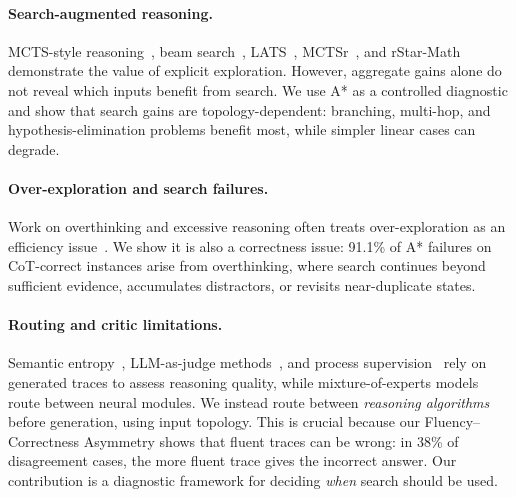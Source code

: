 \documentclass[11pt]{article}
\begin{document}
\paragraph{Search-augmented reasoning.}
MCTS-style reasoning~\cite{hao2023reasoning}, beam search~\cite{xie2024self}, LATS~\cite{zhou2024lats}, MCTSr~\cite{zhang2024mctsrmath}, and rStar-Math~\cite{guan2025rstar} demonstrate the value of explicit exploration. However, aggregate gains alone do not reveal which inputs benefit from search. We use A* as a controlled diagnostic and show that search gains are topology-dependent: branching, multi-hop, and hypothesis-elimination problems benefit most, while simpler linear cases can degrade.

\paragraph{Over-exploration and search failures.}
Work on overthinking and excessive reasoning often treats over-exploration as an efficiency issue~\cite{sui2025overthinking,wang2025fetch,ma2025cotvalve}. We show it is also a correctness issue: 91.1\% of A* failures on CoT-correct instances arise from overthinking, where search continues beyond sufficient evidence, accumulates distractors, or revisits near-duplicate states.

\paragraph{Routing and critic limitations.}
Semantic entropy~\cite{kossen2024semanticentropyprobesrobust}, LLM-as-judge methods~\cite{zheng2023judging}, and process supervision~\cite{lightman2023let} rely on generated traces to assess reasoning quality, while mixture-of-experts models~\cite{shazeer2017outrageouslylargeneuralnetworks} route between neural modules. We instead route between \emph{reasoning algorithms} before generation, using input topology. This is crucial because our Fluency--Correctness Asymmetry shows that fluent traces can be wrong: in 38\% of disagreement cases, the more fluent trace gives the incorrect answer. Our contribution is a diagnostic framework for deciding \emph{when} search should be used.
\end{document}
